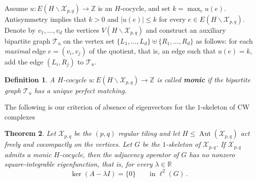 \documentclass[11pt]{article}
\newtheorem{theorem}{Theorem}[section]
\newtheorem{definition}[theorem]{Definition}
\theoremstyle{remark}
\newcommand{\cX}{\mathcal X}
\newcommand{\Z}{\mathbb Z}
\newcommand{\R}{\mathbb R}
\newcommand{\elltwo}{\ell^2}
\newcommand{\Aut}{\operatorname{Aut}}
\newcommand{\ve}{\vec e}
\newcommand{\cev}[1]{\reflectbox{\ensuremath{\vec{\reflectbox{\ensuremath{#1}}}}}}
\begin{document}

Assume $u:E(H\backslash \cX_{p,q}) \to \Z$ is an $H$-cocycle, and set $k=\max _e u(e)$. Antisymmetry implies that $k>0$ and $|u(e)|\le k$ for every $e\in E(H\backslash \cX_{p,q})$. Denote by $v_1,\ldots, v_d$ the vertices $V(H\backslash \cX_{p,q})$  and construct an auxiliary bipartite graph $\mathcal T_u$ on the vertex set  $\{L_1,\ldots,L_d\} \uplus \{R_1,\ldots, R_d\}$ as follows: for each \emph{maximal} edge $e = (v_i,v_j)$ of the quotient, that is, an edge such that $u(e)=k$, add the edge $(L_i, R_j)$ to $\mathcal T_u$. %


\begin{definition}\label{def:monic}
A $H$-cocycle $u:E(H\backslash \cX_{p,q}) \to \Z$ is called {\bf monic} if the bipartite graph $\mathcal T_u$ has a unique perfect matching.
\end{definition}


The following is our criterion of absence of eigenvectors for the $1$-skeleton of CW complexes

\begin{theorem}\label{thm:criterion}
Let $\mathcal X_{p,q}$ be the $(p,q)$ regular tiling and let $H\leq\Aut(\mathcal X_{p,q})$ act freely and cocompactly on the vertices. Let $G$ be the $1$-skeleton of $\mathcal X_{p,q}$. If $\mathcal X_{p,q}$ admits a monic $H$-cocycle, then the adjacency operator of $G$ has no nonzero square-integrable eigenfunction, that is, for every $\lambda\in\R$
\[
\ker(A-\lambda I)=\{0\}
\qquad\text{in }\elltwo(G) \, .
\]
\end{theorem}
\end{document}
